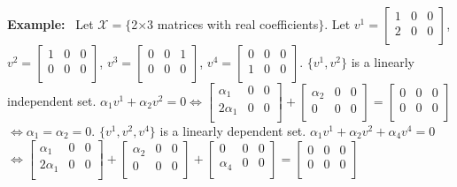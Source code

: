 \documentclass[letterpaper]{article}
\begin{document}
       \newpage

\noindent \textbf{Example:}~ Let $\mathcal{X}=\{$2$\times$3 matrices with real coefficients$\}$. Let $v^1=\begin{bmatrix}
    1 & 0 & 0\\
    2 & 0 & 0\\
    \end{bmatrix}$, $v^2=\begin{bmatrix}
    1 & 0 & 0\\
    0 & 0 & 0\\
    \end{bmatrix}$, $v^3=\begin{bmatrix}
    0 & 0 & 1\\
    0 & 0 & 0\\
    \end{bmatrix}$, $v^4=\begin{bmatrix}
    0 & 0 & 0\\
    1 & 0 & 0\\
    \end{bmatrix}$.
    \newline\newline
    $\{v^1,v^2\}$ is a linearly independent set.
    \newline
    $\alpha_1v^1+\alpha_2v^2=0\iff\begin{bmatrix}
    \alpha_1 & 0 & 0\\
    2\alpha_1 & 0 & 0\\
    \end{bmatrix} + \begin{bmatrix}
    \alpha_2 & 0 & 0\\
    0 & 0 & 0\\
    \end{bmatrix} = \begin{bmatrix}
    0 & 0 & 0\\
    0 & 0 & 0\\
    \end{bmatrix}$
    \newline$
    \iff\alpha_1=\alpha_2=0$.
    \newpage
    $\{v^1,v^2,v^4\}$ is a linearly dependent set.
    \newline
    $\alpha_1v^1+\alpha_2v^2+\alpha_4v^4=0$
    \newline
    $\iff\begin{bmatrix}
    \alpha_1 & 0 & 0\\
    2\alpha_1 & 0 & 0\\
    \end{bmatrix} + \begin{bmatrix}
    \alpha_2 & 0 & 0\\
    0 & 0 & 0\\
    \end{bmatrix} + \begin{bmatrix}
    0 & 0 & 0\\
    \alpha_4 & 0 & 0\\
    \end{bmatrix}= \begin{bmatrix}
    0 & 0 & 0\\
    0 & 0 & 0\\
    \end{bmatrix}$
\end{document}
